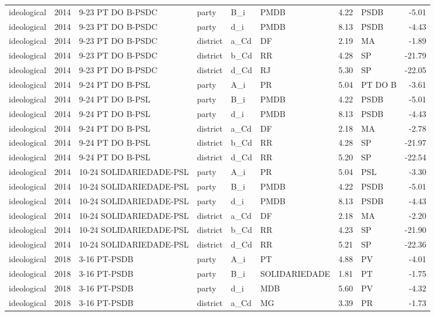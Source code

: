 \begin{landscape}
\begin{longtable}{lllL{2.2cm}lL{3.0cm}rL{3.0cm}r}
ideological & 2014 & 9-23 PT DO B-PSDC & party & B\_i & PMDB & 4.22 & PSDB & -5.01 \\
ideological & 2014 & 9-23 PT DO B-PSDC & party & d\_i & PMDB & 8.13 & PSDB & -4.43 \\
ideological & 2014 & 9-23 PT DO B-PSDC & district & a\_Cd & DF & 2.19 & MA & -1.89 \\
ideological & 2014 & 9-23 PT DO B-PSDC & district & b\_Cd & RR & 4.28 & SP & -21.79 \\
ideological & 2014 & 9-23 PT DO B-PSDC & district & d\_Cd & RJ & 5.30 & SP & -22.05 \\
ideological & 2014 & 9-24 PT DO B-PSL & party & A\_i & PR & 5.04 & PT DO B & -3.61 \\
ideological & 2014 & 9-24 PT DO B-PSL & party & B\_i & PMDB & 4.22 & PSDB & -5.01 \\
ideological & 2014 & 9-24 PT DO B-PSL & party & d\_i & PMDB & 8.13 & PSDB & -4.43 \\
ideological & 2014 & 9-24 PT DO B-PSL & district & a\_Cd & DF & 2.18 & MA & -2.78 \\
ideological & 2014 & 9-24 PT DO B-PSL & district & b\_Cd & RR & 4.28 & SP & -21.97 \\
ideological & 2014 & 9-24 PT DO B-PSL & district & d\_Cd & RR & 5.20 & SP & -22.54 \\
ideological & 2014 & 10-24 SOLIDARIEDADE-PSL & party & A\_i & PR & 5.04 & PSL & -3.30 \\
ideological & 2014 & 10-24 SOLIDARIEDADE-PSL & party & B\_i & PMDB & 4.22 & PSDB & -5.01 \\
ideological & 2014 & 10-24 SOLIDARIEDADE-PSL & party & d\_i & PMDB & 8.13 & PSDB & -4.43 \\
ideological & 2014 & 10-24 SOLIDARIEDADE-PSL & district & a\_Cd & DF & 2.18 & MA & -2.20 \\
ideological & 2014 & 10-24 SOLIDARIEDADE-PSL & district & b\_Cd & RR & 4.23 & SP & -21.90 \\
ideological & 2014 & 10-24 SOLIDARIEDADE-PSL & district & d\_Cd & RR & 5.21 & SP & -22.36 \\
ideological & 2018 & 3-16 PT-PSDB & party & A\_i & PT & 4.88 & PV & -4.01 \\
ideological & 2018 & 3-16 PT-PSDB & party & B\_i & SOLIDARIEDADE & 1.81 & PT & -1.75 \\
ideological & 2018 & 3-16 PT-PSDB & party & d\_i & MDB & 5.60 & PV & -4.32 \\
ideological & 2018 & 3-16 PT-PSDB & district & a\_Cd & MG & 3.39 & PR & -1.73 \\

\end{longtable}
\end{landscape}
